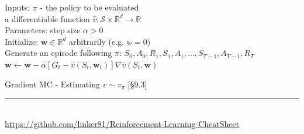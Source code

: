 \documentclass[10pt,landscape]{article}
\begin{document}
\begin{multicols}{3}
\begin{algorithm}[H]
Inputs: $\pi$ - the policy to be evaluated \\
		a differentiable function $\hat{v} : \mathcal{S} \times \mathbb{R}^d \rightarrow \mathbb{R}$ \\
Parameters: step size $\alpha > 0$ \\
Initialize: $\mathbf{w} \in \mathbb{R}^d$ arbitrarily (e.g. $\mathbb{w} = 0$) \\
{
    Generate an episode following $\pi$: $S_0, A_0, R_1, S_1, A_1,..., S_{T-1}, A_{T-1}, R_T$\\
    {
		$\mathbf{w} \leftarrow \mathbf{w} - \alpha \left [ G_t - \hat{v}(S_t, \mathbf{w}_t) \right ] \nabla \hat{v}(S_t, \mathbf{w})$
    }
 }
\caption{Gradient MC - Estimating $v \sim v_{\pi}$ [§9.3]}
\end{algorithm}

\rule{0.3\linewidth}{0.25pt} \\
\scriptsize
\href{https://github.com/linker81/Reinforcement-Learning-CheatSheet}{https://github.com/linker81/Reinforcement-Learning-CheatSheet}
\end{multicols}
\end{document}
